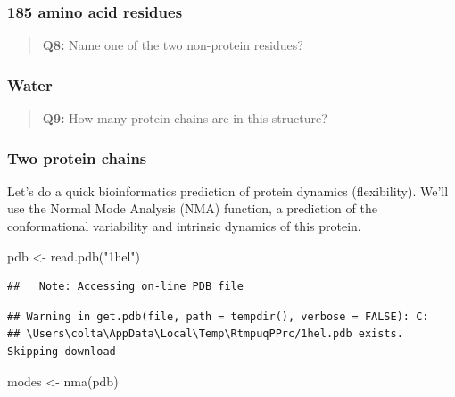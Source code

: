 \documentclass[
]{article}
\newenvironment{Shaded}{\begin{snugshade}}{\end{snugshade}}
\newcommand{\FunctionTok}[1]{\textcolor[rgb]{0.00,0.00,0.00}{#1}}
\newcommand{\NormalTok}[1]{#1}
\newcommand{\OtherTok}[1]{\textcolor[rgb]{0.56,0.35,0.01}{#1}}
\newcommand{\StringTok}[1]{\textcolor[rgb]{0.31,0.60,0.02}{#1}}
\begin{document}
\hypertarget{amino-acid-residues}{%
\subsubsection{185 amino acid residues}\label{amino-acid-residues}}

\begin{quote}
\textbf{Q8:} Name one of the two non-protein residues?
\end{quote}

\hypertarget{water}{%
\subsubsection{Water}\label{water}}

\begin{quote}
\textbf{Q9:} How many protein chains are in this structure?
\end{quote}

\hypertarget{two-protein-chains}{%
\subsubsection{Two protein chains}\label{two-protein-chains}}

Let's do a quick bioinformatics prediction of protein dynamics
(flexibility). We'll use the Normal Mode Analysis (NMA) function, a
prediction of the conformational variability and intrinsic dynamics of
this protein.

\begin{Shaded}
\begin{Highlighting}[]
\NormalTok{pdb }\OtherTok{\textless{}{-}} \FunctionTok{read.pdb}\NormalTok{(}\StringTok{"1hel"}\NormalTok{)}
\end{Highlighting}
\end{Shaded}

\begin{verbatim}
##   Note: Accessing on-line PDB file
\end{verbatim}

\begin{verbatim}
## Warning in get.pdb(file, path = tempdir(), verbose = FALSE): C:
## \Users\colta\AppData\Local\Temp\RtmpuqPPrc/1hel.pdb exists. Skipping download
\end{verbatim}

\begin{Shaded}
\begin{Highlighting}[]
\NormalTok{modes }\OtherTok{\textless{}{-}} \FunctionTok{nma}\NormalTok{(pdb)}
\end{Highlighting}
\end{Shaded}
\end{document}
